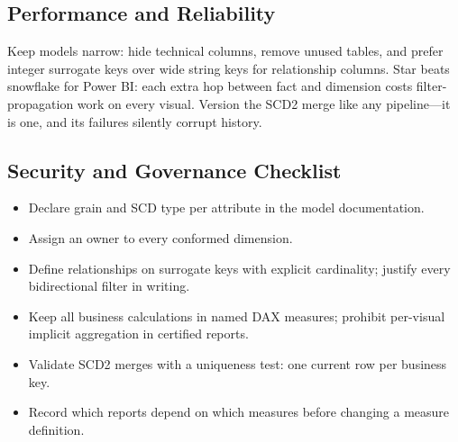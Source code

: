 \subsection{Performance and Reliability}
Keep models narrow: hide technical columns, remove unused tables, and prefer integer surrogate keys over wide string keys for relationship columns. Star beats snowflake for Power BI: each extra hop between fact and dimension costs filter-propagation work on every visual. Version the SCD2 merge like any pipeline---it is one, and its failures silently corrupt history.

\subsection{Security and Governance Checklist}
\begin{itemize}
    \item Declare grain and SCD type per attribute in the model documentation.
    \item Assign an owner to every conformed dimension.
    \item Define relationships on surrogate keys with explicit cardinality; justify every bidirectional filter in writing.
    \item Keep all business calculations in named DAX measures; prohibit per-visual implicit aggregation in certified reports.
    \item Validate SCD2 merges with a uniqueness test: one current row per business key.
    \item Record which reports depend on which measures before changing a measure definition.
\end{itemize}


